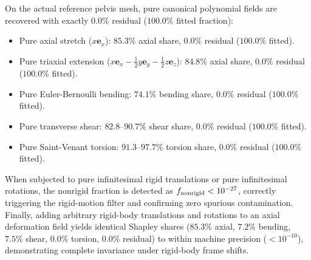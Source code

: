 \documentclass[11pt]{article}
\begin{document}
On the actual reference pelvis mesh, pure canonical polynomial fields are recovered with exactly $0.0\%$ residual ($100.0\%$ fitted fraction):
\begin{itemize}
\item Pure axial stretch ($x\mathbf e_x$): $85.3\%$ axial share, $0.0\%$ residual ($100.0\%$ fitted).
\item Pure triaxial extension ($x\mathbf e_x - \tfrac{1}{2}y\mathbf e_y - \tfrac{1}{2}z\mathbf e_z$): $84.8\%$ axial share, $0.0\%$ residual ($100.0\%$ fitted).
\item Pure Euler-Bernoulli bending: $74.1\%$ bending share, $0.0\%$ residual ($100.0\%$ fitted).
\item Pure transverse shear: $82.8\text{--}90.7\%$ shear share, $0.0\%$ residual ($100.0\%$ fitted).
\item Pure Saint-Venant torsion: $91.3\text{--}97.7\%$ torsion share, $0.0\%$ residual ($100.0\%$ fitted).
\end{itemize}
When subjected to pure infinitesimal rigid translations or pure infinitesimal rotations, the nonrigid fraction is detected as $f_{\rm nonrigid} < 10^{-27}$, correctly triggering the rigid-motion filter and confirming zero spurious contamination.
Finally, adding arbitrary rigid-body translations and rotations to an axial deformation field yields identical Shapley shares ($85.3\%$ axial, $7.2\%$ bending, $7.5\%$ shear, $0.0\%$ torsion, $0.0\%$ residual) to within machine precision ($< 10^{-10}$), demonstrating complete invariance under rigid-body frame shifts.
\end{document}
